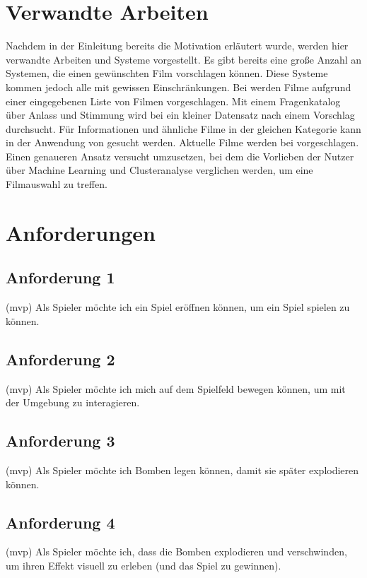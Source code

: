\documentclass[conference]{IEEEtran}
\begin{document}
\section{Verwandte Arbeiten}

Nachdem in der Einleitung bereits die Motivation erläutert wurde, werden hier verwandte Arbeiten und Systeme vorgestellt.
Es gibt bereits eine große Anzahl an Systemen, die einen gewünschten Film vorschlagen können. Diese Systeme kommen jedoch alle mit gewissen Einschränkungen.
Bei \cite{cinemate} werden Filme aufgrund einer eingegebenen Liste von Filmen vorgeschlagen.
Mit einem Fragenkatalog über Anlass und Stimmung wird bei \cite{pickamovieforme} ein kleiner Datensatz nach einem Vorschlag durchsucht.
Für Informationen und ähnliche Filme in der gleichen Kategorie kann in der Anwendung von \cite{bestsimilar} gesucht werden.
Aktuelle Filme werden bei \cite{tastedive} vorgeschlagen.
Einen genaueren Ansatz versucht \cite{MovieGEN} umzusetzen, bei dem die Vorlieben der Nutzer über Machine Learning und Clusteranalyse verglichen werden, um eine Filmauswahl zu treffen.

\section{Anforderungen}

\subsection{Anforderung 1} (mvp)
Als Spieler möchte ich ein Spiel eröffnen können, um ein Spiel spielen zu können.

\subsection{Anforderung 2} (mvp)
Als Spieler möchte ich mich auf dem Spielfeld bewegen können, um mit der Umgebung zu interagieren.

\subsection{Anforderung 3} (mvp)
Als Spieler möchte ich Bomben legen können, damit sie später explodieren können.

\subsection{Anforderung 4} (mvp)
Als Spieler möchte ich, dass die Bomben explodieren und verschwinden, um ihren Effekt visuell zu erleben (und das Spiel zu gewinnen).
\end{document}
